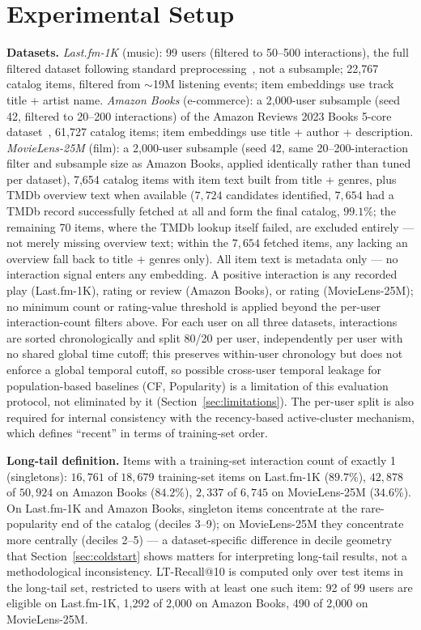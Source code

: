 \documentclass{article}
\begin{document}
\section{Experimental Setup}
\label{sec:setup}

\textbf{Datasets.} \emph{Last.fm-1K} (music): 99 users (filtered to 50--500 interactions), the full filtered dataset following standard preprocessing~\cite{celma2010}, not a subsample; 22{,}767 catalog items, filtered from $\sim$19M listening events; item embeddings use track title + artist name. \emph{Amazon Books} (e-commerce): a 2{,}000-user subsample (seed 42, filtered to 20--200 interactions) of the Amazon Reviews 2023 Books 5-core dataset~\cite{hou2024}, 61{,}727 catalog items; item embeddings use title + author + description. \emph{MovieLens-25M} (film): a 2{,}000-user subsample (seed 42, same 20--200-interaction filter and subsample size as Amazon Books, applied identically rather than tuned per dataset), 7{,}654 catalog items with item text built from title + genres, plus TMDb overview text when available ($7{,}724$ candidates identified, $7{,}654$ had a TMDb record successfully fetched at all and form the final catalog, $99.1\%$; the remaining 70 items, where the TMDb lookup itself failed, are excluded entirely --- not merely missing overview text; within the $7{,}654$ fetched items, any lacking an overview fall back to title + genres only). All item text is metadata only --- no interaction signal enters any embedding. A positive interaction is any recorded play (Last.fm-1K), rating or review (Amazon Books), or rating (MovieLens-25M); no minimum count or rating-value threshold is applied beyond the per-user interaction-count filters above. For each user on all three datasets, interactions are sorted chronologically and split 80/20 per user, independently per user with no shared global time cutoff; this preserves within-user chronology but does not enforce a global temporal cutoff, so possible cross-user temporal leakage for population-based baselines (CF, Popularity) is a limitation of this evaluation protocol, not eliminated by it (Section~\ref{sec:limitations}). The per-user split is also required for internal consistency with the recency-based active-cluster mechanism, which defines ``recent'' in terms of training-set order.

\textbf{Long-tail definition.} Items with a training-set interaction count of exactly 1 (singletons): $16{,}761$ of $18{,}679$ training-set items on Last.fm-1K ($89.7\%$), $42{,}878$ of $50{,}924$ on Amazon Books ($84.2\%$), $2{,}337$ of $6{,}745$ on MovieLens-25M ($34.6\%$). On Last.fm-1K and Amazon Books, singleton items concentrate at the rare-popularity end of the catalog (deciles 3--9); on MovieLens-25M they concentrate more centrally (deciles 2--5) --- a dataset-specific difference in decile geometry that Section~\ref{sec:coldstart} shows matters for interpreting long-tail results, not a methodological inconsistency. LT-Recall@10 is computed only over test items in the long-tail set, restricted to users with at least one such item: 92 of 99 users are eligible on Last.fm-1K, 1{,}292 of 2{,}000 on Amazon Books, 490 of 2{,}000 on MovieLens-25M.
\end{document}
